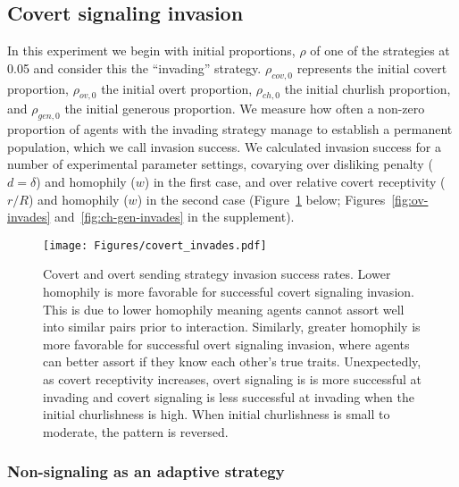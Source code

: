 \documentclass[11pt,letterpaper]{article}
\begin{document}
\subsection{Covert signaling invasion}

In this experiment we begin with initial proportions, $\rho$ of one of the strategies
at 0.05 and consider this the ``invading'' strategy. $\rho_{cov,0}$ represents
the initial covert proportion, $\rho_{ov,0}$ the initial overt proportion,
$\rho_{ch,0}$ the initial churlish proportion, and $\rho_{gen,0}$ the 
initial generous proportion. We measure how often
a non-zero proportion of agents with the invading strategy manage to 
establish a permanent population, which we call invasion success. We calculated
invasion success for a number of experimental parameter settings, covarying
over disliking penalty ($d=\delta$) and homophily ($w$) in the first case,
and over relative covert receptivity ($r/R$) and homophily ($w$) 
in the second case (Figure~\ref{fig:cov-invades} below; Figures~\ref{fig:ov-invades} and~\ref{fig:ch-gen-invades} in the supplement).

\begin{figure}[H]
  \centering
  \texttt{[image: Figures/covert\_invades.pdf]}
  \caption{Covert and overt sending strategy invasion success rates. 
    Lower homophily is more favorable for successful covert signaling invasion.
    This is due to lower homophily meaning agents cannot assort well into
    similar pairs prior to interaction.
    Similarly, greater homophily is more favorable for successful overt
    signaling invasion, where agents can better assort if they know each other's
    true traits. Unexpectedly, as covert receptivity increases, overt signaling
    is is more successful at invading and covert signaling is less successful
    at invading when the initial churlishness is high. When initial
    churlishness is small to moderate, the pattern is reversed.
  }
  \label{fig:cov-invades}
\end{figure}


\subsubsection{Non-signaling as an adaptive strategy}
\end{document}

